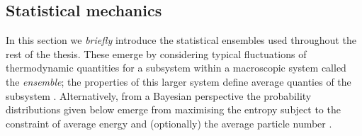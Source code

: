 \subsection{Statistical mechanics}

In this section we \emph{briefly} introduce the statistical ensembles used throughout the rest of the thesis.
These emerge by considering typical fluctuations of thermodynamic quantities for a subsystem within a macroscopic system called the \emph{ensemble}; the properties of this larger system define average quanties of the subsystem \cite{Landau2008}.
Alternatively, from a Bayesian perspective the probability distributions given below emerge from maximising the entropy%
subject to the constraint of average energy and (optionally) the average particle number \cite{JaynesPR1957,JaynesPR1957a}.

